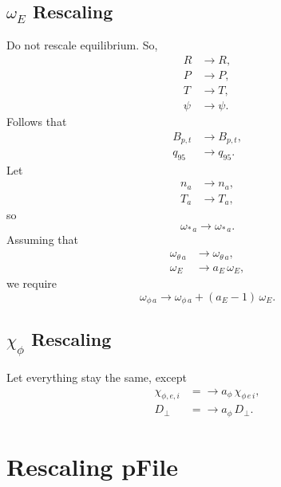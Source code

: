 \documentclass[12pt]{article}
\begin{document}
\subsection{$\omega_E$ Rescaling}
Do not rescale equilibrium. So,
\begin{align}
R&\rightarrow R,\\[0.5ex]
P&\rightarrow P,\\[0.5ex]
T&\rightarrow T,\\[0.5ex]
\psi&\rightarrow\psi.
\end{align}
Follows that
\begin{align}
B_{p,t}&\rightarrow B_{p,t},\\[0.5ex]
q_{95}&\rightarrow q_{95}.
\end{align}
Let
\begin{align}
n_a&\rightarrow n_a,\\[0.5ex]
T_a&\rightarrow T_a,
\end{align}
so
\begin{equation}
\omega_{\ast\,a} \rightarrow \omega_{\ast\,a}.
\end{equation}
Assuming that
\begin{align}
\omega_{\theta\,a}&\rightarrow \omega_{\theta\,a},\\[0.5ex]
\omega_E &\rightarrow a_E\,\omega_E,
\end{align}
we require 
\begin{equation}
\omega_{\phi\,a}\rightarrow \omega_{\phi\,a} + (a_E-1)\,\omega_E.
\end{equation}

\subsection{$\chi_\phi$ Rescaling}
Let everything stay the same, except
\begin{align}
\chi_{\phi,e,i} &= \rightarrow a_\phi\,\chi_{\phi\,e\,i},\\[0.5ex]
D_\perp &= \rightarrow a_\phi\,D_\perp.
\end{align}

\section{Rescaling pFile}
\end{document}
